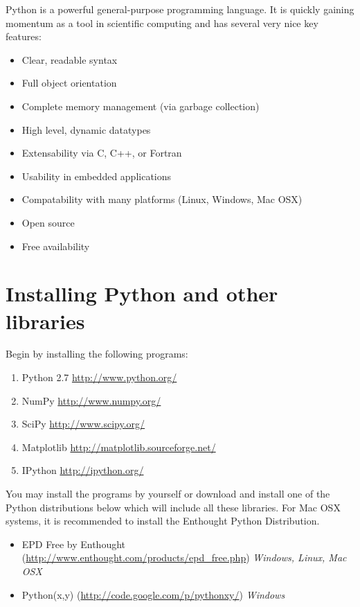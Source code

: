 \label{lab:Essential_Python}

Python is a powerful general-purpose programming language. 
It is quickly gaining momentum as a tool in scientific computing and has several very nice key features:
\begin{itemize}
\item Clear, readable syntax
\item Full object orientation
\item Complete memory management (via garbage collection)
\item High level, dynamic datatypes
\item Extensability via C, C++, or Fortran
\item Usability in embedded applications
\item Compatability with many platforms (Linux, Windows, Mac OSX)
\item Open source
\item Free availability
\end{itemize}

\section*{Installing Python and other libraries}
Begin by installing the following programs:
\begin{enumerate}
\item Python 2.7 \url{http://www.python.org/}
\item NumPy \url{http://www.numpy.org/}
\item SciPy \url{http://www.scipy.org/}
\item Matplotlib \url{http://matplotlib.sourceforge.net/}
\item IPython \url{http://ipython.org/}
\end{enumerate}
You may install the programs by yourself or download and install one of the Python distributions below which will include all these libraries.
For Mac OSX systems, it is recommended to install the Enthought Python Distribution.
\begin{itemize}
\item EPD Free by Enthought (\url{http://www.enthought.com/products/epd_free.php}) \emph{Windows, Linux, Mac OSX}
\item Python(x,y) (\url{http://code.google.com/p/pythonxy/}) \emph{Windows}
\end{itemize}

